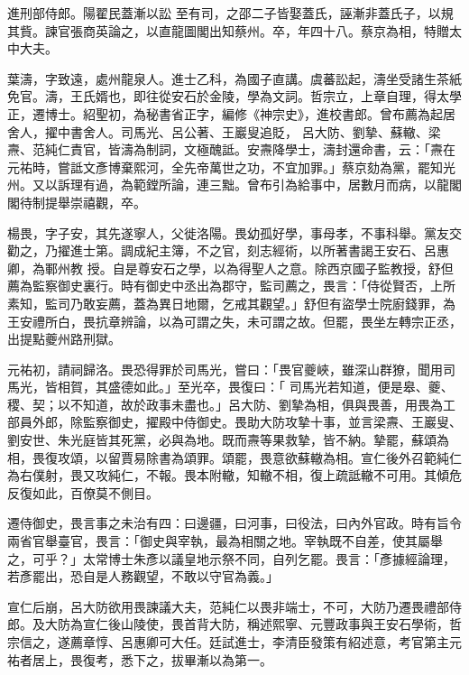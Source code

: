 \begin{pinyinscope}
 進刑部侍郎。陽翟民蓋漸以訟
 至有司，之邵二子皆娶蓋氏，誣漸非蓋氏子，以規其貲。諫官張商英論之，以直龍圖閣出知蔡州。卒，年四十八。蔡京為相，特贈太中大夫。



 葉濤，字致遠，處州龍泉人。進士乙科，為國子直講。虞蕃訟起，濤坐受諸生茶紙免官。濤，王氏婿也，即往從安石於金陵，學為文詞。哲宗立，上章自理，得太學正，遷博士。紹聖初，為秘書省正字，編修《神宗史》，進校書郎。曾布薦為起居舍人，擢中書舍人。司馬光、呂公著、王巖叟追貶，
 呂大防、劉摯、蘇轍、梁燾、范純仁責官，皆濤為制詞，文極醜詆。安燾降學士，濤封還命書，云：「燾在元祐時，嘗詆文彥博棄熙河，全先帝萬世之功，不宜加罪。」蔡京劾為黨，罷知光州。又以訴理有過，為範鏜所論，連三黜。曾布引為給事中，居數月而病，以龍閣閣待制提舉崇禧觀，卒。



 楊畏，字子安，其先遂寧人，父徙洛陽。畏幼孤好學，事母孝，不事科舉。黨友交勸之，乃擢進士第。調成紀主簿，不之官，刻志經術，以所著書謁王安石、呂惠卿，為鄆州教
 授。自是尊安石之學，以為得聖人之意。除西京國子監教授，舒但薦為監察御史裏行。時有御史中丞出為郡守，監司薦之，畏言：「侍從賢否，上所素知，監司乃敢妄薦，蓋為異日地爾，乞戒其觀望。」舒但有盜學士院廚錢罪，為王安禮所白，畏抗章辨論，以為可謂之失，未可謂之故。但罷，畏坐左轉宗正丞，出提點夔州路刑獄。



 元祐初，請祠歸洛。畏恐得罪於司馬光，嘗曰：「畏官夔峽，雖深山群獠，聞用司馬光，皆相賀，其盛德如此。」至光卒，畏復曰：「
 司馬光若知道，便是皋、夔、稷、契；以不知道，故於政事未盡也。」呂大防、劉摯為相，俱與畏善，用畏為工部員外郎，除監察御史，擢殿中侍御史。畏助大防攻摯十事，並言梁燾、王巖叟、劉安世、朱光庭皆其死黨，必與為地。既而燾等果救摯，皆不納。摯罷，蘇頌為相，畏復攻頌，以留賈易除書為頌罪。頌罷，畏意欲蘇轍為相。宣仁後外召範純仁為右僕射，畏又攻純仁，不報。畏本附轍，知轍不相，復上疏詆轍不可用。其傾危反復如此，百僚莫不側目。



 遷侍御史，畏言事之未治有四：曰邊疆，曰河事，曰役法，曰內外官政。時有旨令兩省官舉臺官，畏言：「御史與宰執，最為相關之地。宰執既不自差，使其屬舉之，可乎？」太常博士朱彥以議皇地示祭不同，自列乞罷。畏言：「彥據經論理，若彥罷出，恐自是人務觀望，不敢以守官為義。」



 宣仁后崩，呂大防欲用畏諫議大夫，范純仁以畏非端士，不可，大防乃遷畏禮部侍郎。及大防為宣仁後山陵使，畏首背大防，稱述熙寧、元豐政事與王安石學術，哲
 宗信之，遂薦章惇、呂惠卿可大任。廷試進士，李清臣發策有紹述意，考官第主元祐者居上，畏復考，悉下之，拔畢漸以為第一。




\end{pinyinscope}
